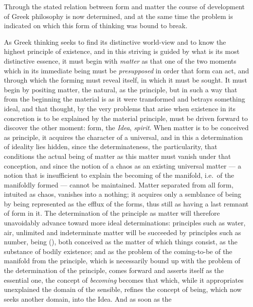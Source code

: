 Through the stated relation between form and matter the course of development
of Greek philosophy is now determined, and at the same time the problem is
indicated on which this form of thinking
was bound to break.

As Greek thinking seeks to find its distinctive world-view and to know the
highest principle of existence, and in this striving is guided by what is its
most distinctive essence, it must begin with \emph{matter} as that one of the
two moments which in its immediate being must be \emph{presupposed} in order
that form can act, and through which the forming must reveal itself, in which
it must be sought. It must begin by positing matter, the natural, as the
principle, but in such a way that from the beginning the material is as it
were transformed and betrays something ideal, and that thought, by the very
problems that arise when existence in its concretion is to be explained by the
material principle, must be driven forward to discover the other moment:
form, the \emph{Idea}, \emph{spirit}. When matter is to be conceived as
principle, it acquires the character of a universal, and in this a
determination of ideality lies hidden, since the determinateness, the
particularity, that conditions the actual being of matter as this matter must
vanish under that conception, and since the notion of a chaos as an existing
universal matter --- a notion that is insufficient to explain the becoming of
the manifold, i.e.\ of the manifoldly formed --- cannot be maintained. Matter
separated from all form, intuited as chaos, vanishes into a nothing; it
acquires only a semblance of being by being represented as the efflux of the
forms, thus still as having a last remnant of form in it. The determination of
the principle as matter will therefore unavoidably advance toward more ideal
determinations: principles such as water, air, unlimited and indeterminate
matter will be succeeded by principles such as number, being
(), both conceived as the matter of which things consist, as the
substance of bodily existence; and as the problem of the coming-to-be of the
manifold from the principle, which is necessarily bound up with the problem of
the determination of the principle, comes forward and asserts itself as the
essential one, the concept of \emph{becoming} becomes that which, while it
appropriates unexplained the domain of the sensible, refines the concept of
being, which now seeks another domain, into the Idea. And as soon as the
